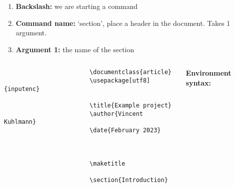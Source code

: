 \begin{frame}[fragile]
\begin{columns}
\begin{column}{0.6\textwidth}
            \begin{enumerate}[label=\arabic*)]
                \item \textbf{Backslash:} we are starting a command
                \item \textbf{Command name:} `section', place a header in the
                document. Takes 1 argument.
                \item \textbf{Argument 1:} the name of the section
            \end{enumerate}
        \end{column}
    \end{columns}
\end{frame}


\begin{frame}[fragile]
    \begin{columns}
        \begin{column}{0.4\textwidth}
            \begin{adjustbox}{frame=1pt 5pt,valign=t}%
                \begin{minipage}{\textwidth}%
                    \begin{verbatim} 
                        \documentclass{article}
                        \usepackage[utf8]{inputenc}

                        \title{Example project}
                        \author{Vincent Kuhlmann}
                        \date{February 2023}

                        

                        \maketitle

                        \section{Introduction}

                        
                    \end{verbatim}
                \end{minipage}
            \end{adjustbox}
        \end{column}
        \begin{column}{0.6\textwidth}
            {\large\textbf{Environment syntax:}}


\end{column}
\end{columns}
\end{frame}
